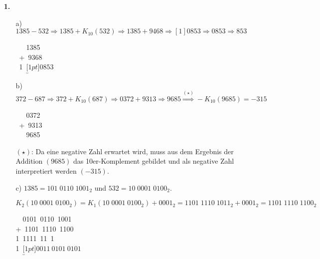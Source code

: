 \documentclass[a4paper,10pt]{scrartcl}
\begin{document}
\begin{enumerate}
    \item[\textbf{1.}]
        \begin{enumerate}
            \item[a)]
                $1385 - 532 \Rightarrow 1385 + K_{10}(532) \Rightarrow 1385 + 9468 \Rightarrow [1]0853 \Rightarrow 0853 \Rightarrow 853$
                
                \begin{wmcalc}
                    ~~~1385\\
                    ~+~9368\\
                    ~1~$\underbracket[1pt]{0853}$
                \end{wmcalc}              
                
            \item[b)]
                $372 - 687 \Rightarrow 372 + K_{10}(687) \Rightarrow 0372 + 9313 \Rightarrow 9685 \overset{(\star)}{\Rightarrow} -K_{10}(9685) = -315$
                
                \begin{wmcalc}
                    ~~~0372\\
                    ~+~9313\\
                    ~~~9685
                \end{wmcalc}              
                
                $(\star)$: Da eine negative Zahl erwartet wird, muss aus dem Ergebnis der Addition $(9685)$ das 10er-Komplement gebildet und als negative Zahl
                interpretiert werden $(-315)$.
                
            \item[c)]
                $1385 = 101\;0110\;1001_2$ und $532 = 10\;0001\;0100_2$.
                
                \begin{dmath*}
                    K_2(10\;0001\;0100_2) 
                    = K_1(10\;0001\;0100_2) + 0001_2 
                    = 1101\;1110\;1011_2 + 0001_2 
                    = 1101\;1110\;1100_2
                \end{dmath*}
                
                \begin{wmcalc}
                    ~~0101~0110~1001\\
                    +~1101~1110~1100\\
                    1~1111~11~1~~~~~~\\
                    1~$\underbracket[1pt]{0011~0101~0101}$
                \end{wmcalc}
                

\end{enumerate}
\end{enumerate}
\end{document}
